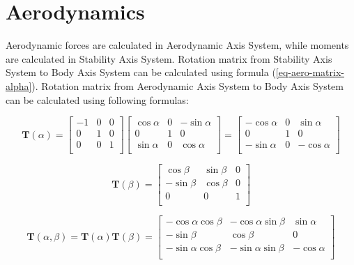 \chapter{Aerodynamics}

Aerodynamic forces are calculated in Aerodynamic Axis System, while moments are calculated in Stability Axis System. Rotation matrix from Stability Axis System to Body Axis System can be calculated using formula (\ref{eq-aero-matrix-alpha}). Rotation matrix from Aerodynamic Axis System to Body Axis System can be calculated using following formulas:

\begin{equation}
  \label{eq-aero-matrix-alpha}
  \boldsymbol T \left( \alpha \right)
  =
  \left[
    \begin{matrix}
      -1 & 0 & 0 \\
       0 & 1 & 0 \\
       0 & 0 & 1 \\
    \end{matrix}
  \right]
  \left[
    \begin{matrix}
      \cos \alpha & 0 & -\sin \alpha \\
                0 & 1 &            0 \\
      \sin \alpha & 0 &  \cos \alpha \\
    \end{matrix}
  \right]
  =
  \left[
    \begin{matrix}
      -\cos \alpha & 0 &  \sin \alpha \\
                 0 & 1 &            0 \\
      -\sin \alpha & 0 & -\cos \alpha \\
    \end{matrix}
  \right]
\end{equation}

\begin{equation}
  \boldsymbol T \left( \beta \right)
  =
  \left[
    \begin{matrix}
       \cos \beta & \sin \beta & 0 \\
      -\sin \beta & \cos \beta & 0 \\
                0 &          0 & 1 \\
    \end{matrix}
  \right]
\end{equation}

\begin{equation}
  \boldsymbol T \left( \alpha, \beta \right)
  =
  \boldsymbol T \left( \alpha \right) \boldsymbol T \left( \beta \right)
  =
  \left[
    \begin{matrix}
      -\cos \alpha \cos \beta & -\cos \alpha \sin \beta &  \sin \alpha \\
                  -\sin \beta &              \cos \beta &            0 \\
      -\sin \alpha \cos \beta & -\sin \alpha \sin \beta & -\cos \alpha \\
    \end{matrix}
  \right]
\end{equation}

